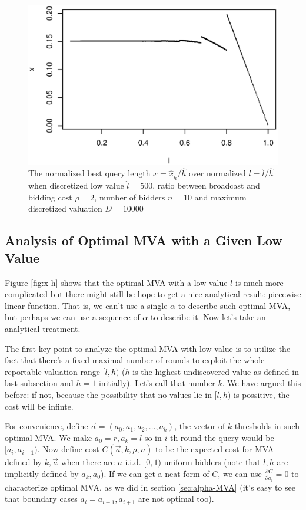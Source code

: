\begin{figure}
\centering
    \includegraphics[trim=0mm 5mm 5mm 15mm, clip, width=\linewidth]{figures/10000-500-2-1-10}
    \caption{The normalized best query length $x = \hat x_{\hat h} / \hat h$
    over normalized $l = \hat l / \hat h$ when discretized low value $\hat l =
    500$, ratio between broadcast and bidding cost $\rho = 2$, number of
    bidders $n = 10$ and maximum discretized valuation $D =
    10000$}\label{fig:x-l}
\end{figure}

\subsection{Analysis of Optimal MVA with a Given Low Value}\label{sec:general_analysis}

Figure \ref{fig:x-h} shows that the optimal MVA with a low value $l$ is
much more complicated but there might still be hope to get a nice analytical
result: piecewise linear function. That is, we can't use a single $\alpha$ to
describe such optimal MVA, but perhaps we can use a sequence of $\alpha$ to
describe it. Now let's take an analytical treatment.

The first key point to analyze the optimal MVA with low value is to utilize
the fact that there's a fixed maximal number of rounds to exploit the whole
reportable valuation range $[l, h)$ ($h$ is the highest undiscovered
value as defined in last subsection and $h = 1$ initially). Let's call that
number $k$. We have argued this before: if not, because the possibility that no
values lie in $[l, h)$ is possitive, the cost will be infinte.

For convenience, define $\vec a = (a_0, a_1, a_2, \ldots, a_k)$, the vector of
$k$ thresholds in such optimal MVA. We make $a_0 = r, a_k = l$ so in $i$-th
round the query would be $[a_i, a_{i-1})$. Now define cost $C(\vec a, k, \rho,
n)$ to be the expected cost for MVA defined by $k, \vec a$ when there are $n$
i.i.d.  $[0, 1)$-uniform bidders (note that $l, h$ are implicitly defined by
$a_k, a_0$). If we can get a neat form of $C$, we can use $\frac{\partial
C}{\partial a_i} = 0 $ to characterize optimal MVA, as we did in section
\ref{sec:alpha-MVA} (it's easy to see that boundary cases $a_i = a_{i-1},
a_{i+1}$ are not optimal too).

